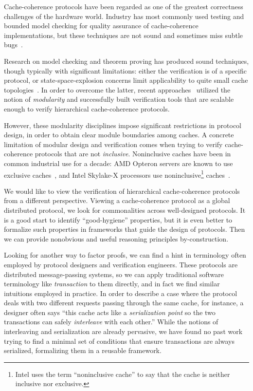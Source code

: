 \documentclass[sigplan,10pt,review,anonymous,screen]{acmart}\settopmatter{printfolios=true,printccs=false,printacmref=false}
\begin{document}
Cache-coherence protocols have been regarded as one of the greatest correctness challenges of the hardware world.
Industry has most commonly used testing and bounded model checking for quality assurance of cache-coherence implementations, but these techniques are not sound and sometimes miss subtle bugs~\cite{ccbug}.

Research on model checking and theorem proving has produced sound techniques, though typically with significant limitations:
either the verification is of a specific protocol, or state-space-explosion concerns limit applicability to quite small cache topologies~\cite{Komuravelli:2014,Murali:2015,Banks:2017,Oswald:2018}.
In order to overcome the latter, recent approaches~\cite{Chen:2008,Chen:2010,McMillan:2016,Opeoluwa:2016,Opeoluwa:2017,Oswald:2020} utilized the notion of \emph{modularity} and successfully built verification tools that are scalable enough to verify hierarchical cache-coherence protocols.

However, these modularity disciplines impose significant restrictions in protocol design, in order to obtain clear module boundaries among caches.
A concrete limitation of modular design and verification comes when trying to verify cache-coherence protocols that are not \emph{inclusive}.
Noninclusive caches have been in common industrial use for a decade: AMD Opteron servers are known to use exclusive caches~\cite{Irazoqui:2016}, and Intel Skylake-X processors use noninclusive\footnote{Intel uses the term ``noninclusive cache'' to say that the cache is neither inclusive nor exclusive.} caches~\cite{intel-non-inclusive,Zhao:2010,Yan:2019}.

We would like to view the verification of hierarchical cache-coherence protocols from a different perspective.
Viewing a cache-coherence protocol as a global distributed protocol, we look for commonalities across well-designed protocols.
It is a good start to identify ``good-hygiene'' properties, but it is even better to formalize such properties in frameworks that guide the design of protocols.
Then we can provide nonobvious and useful reasoning principles by-construction.

Looking for another way to factor proofs, we can find a hint in terminology often employed by protocol designers and verification engineers.
These protocols are distributed message-passing systems, so we can apply traditional software terminology like \emph{transaction} to them directly, and in fact we find similar intuitions employed in practice.
In order to describe a case where the protocol deals with two different requests passing through the same cache, for instance, a designer often says ``this cache acts like a \emph{serialization point} so the two transactions can safely \emph{interleave} with each other.''
While the notions of interleaving and serialization are already pervasive, we have found no past work trying to find a minimal set of conditions that ensure transactions are always serialized, formalizing them in a reusable framework.
\end{document}
